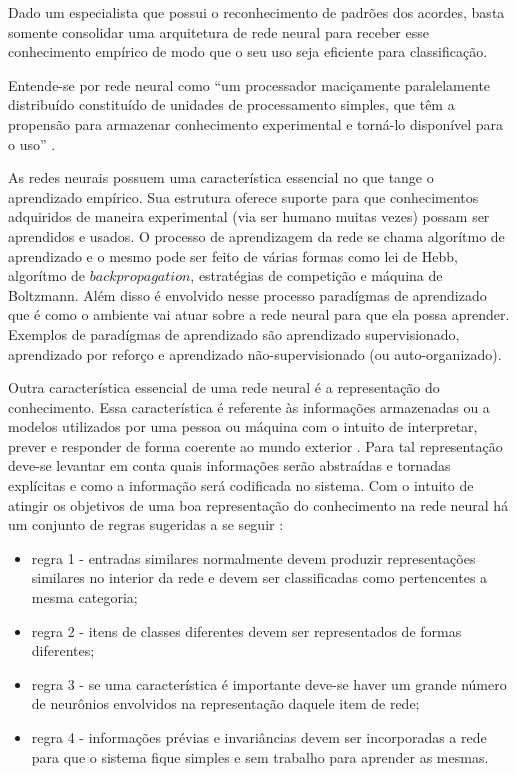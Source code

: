 Dado um especialista que possui o reconhecimento de padrões dos acordes, basta somente consolidar uma arquitetura de rede neural para receber esse conhecimento empírico de modo que o seu uso seja eficiente para classificação.

Entende-se por rede neural como ``um processador maciçamente paralelamente distribuído constituído de unidades de processamento simples, que têm a propensão para armazenar conhecimento experimental e torná-lo disponível para o uso'' \cite{haykin2009neural}.

As redes neurais possuem uma característica essencial no que tange o aprendizado empírico. Sua estrutura oferece suporte para que conhecimentos adquiridos de maneira experimental (via ser humano muitas vezes) possam ser aprendidos e usados. O processo de aprendizagem da rede se chama algorítmo de aprendizado e o mesmo pode ser feito de várias formas como lei de Hebb, algorítmo de $backpropagation$, estratégias de competição e máquina de Boltzmann. Além disso é envolvido nesse processo paradígmas de aprendizado que é como o ambiente vai atuar sobre a rede neural para que ela possa aprender. Exemplos de paradígmas de aprendizado são aprendizado supervisionado, aprendizado por reforço e aprendizado não-supervisionado (ou auto-organizado).

Outra característica essencial de uma rede neural é a representação do conhecimento. Essa característica é referente às informações armazenadas ou a modelos utilizados por uma pessoa ou máquina com o intuito de interpretar, prever e responder de forma coerente ao mundo exterior \cite{haykin2009neural}. Para tal representação deve-se levantar em conta quais informações serão abstraídas e tornadas explícitas e como a informação será codificada no sistema. Com o intuito de atingir os objetivos de uma boa representação do conhecimento na rede neural há um conjunto de regras sugeridas a se seguir \cite{haykin2009neural}:
\begin{itemize}
	\item regra 1 - entradas similares normalmente devem produzir representações similares no interior da rede e devem ser classificadas como pertencentes a mesma categoria;
	\item regra 2 - itens de classes diferentes devem ser representados de formas diferentes;
	\item regra 3 - se uma característica é importante deve-se haver um grande número de neurônios envolvidos na representação daquele item de rede;
	\item regra 4 - informações prévias e invariâncias devem ser incorporadas a rede para que o sistema fique simples e sem trabalho para aprender as mesmas.
\end{itemize}

